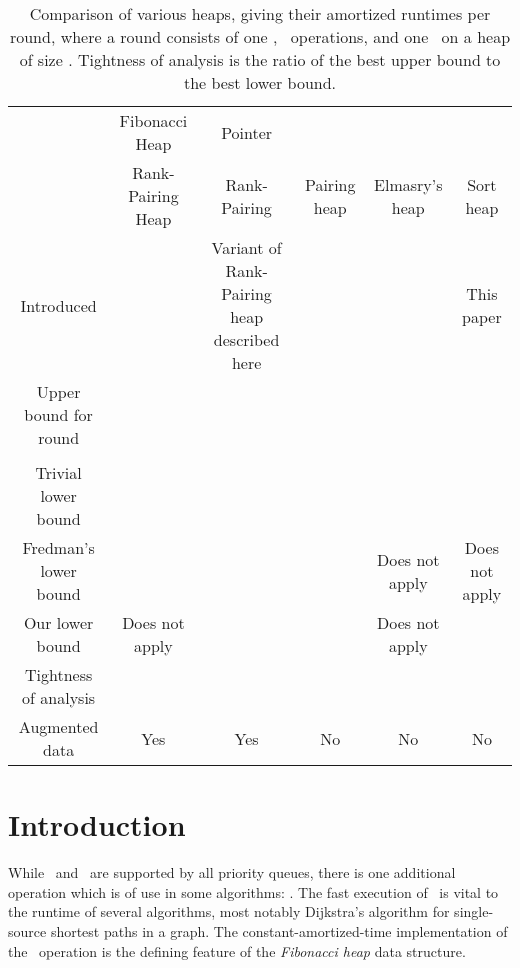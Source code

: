 \begin{fullonly}
\begin{sidewaystable} \footnotesize 
\begin{tabular}{c|ccccc}
&Fibonacci Heap& Pointer\\
&Rank-Pairing Heap &  Rank-Pairing & Pairing heap & Elmasry's heap & Sort heap\\ \hline \hline
Introduced &  \parbox{0.5in}{\center \cite{DBLP:journals/jacm/FredmanT87} \cite{DBLP:journals/siamcomp/HaeuplerST11}} & \parbox{1.5in}{\center Variant of Rank-Pairing heap described here} & \cite{DBLP:journals/algorithmica/FredmanSST86}&\cite{DBLP:conf/esa/Elmasry10,DBLP:conf/soda/Elmasry09}  & This paper\\ 
\hline
Upper bound for round &  &  &  &  & \\
&  & & \cite{DBLP:conf/focs/Pettie05} \\ 
\hline
Trivial lower bound &  &  &  &  & \\
\parbox{1.5in}{\center Fredman's lower bound \cite{DBLP:journals/jacm/Fredman99}} &  & &  &Does not apply &Does not apply\\
Our lower bound& Does not apply &   &   & Does not apply &  \\
\hline
Tightness of analysis &  &  &  &  & \\
\hline
\hline
Augmented data & Yes & Yes & No & No & No
\end{tabular}
\caption{Comparison of various heaps, giving their amortized runtimes per round, where a round consists of one \opIns,  \opDc\ operations, and one \opEm\ on a heap of size . Tightness of analysis is the ratio of the best upper bound to the best lower bound. }
\end{sidewaystable}
\end{fullonly}



\section{Introduction}



While \opIns\ and \opEm\ are supported by all priority queues, there is one additional operation which is of use in some algorithms: \opDc. The fast execution of \opDc\ is vital to the runtime of several algorithms, most notably Dijkstra's algorithm \cite{springerlink:10.1007/BF01386390} for single-source shortest paths in a graph. The constant-amortized-time implementation of the \opDc\ operation is the defining feature of the \emph{Fibonacci heap} \cite{DBLP:journals/jacm/FredmanT87} data structure. 

